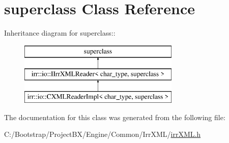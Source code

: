 \hypertarget{classsuperclass}{
\section{superclass Class Reference}
\label{classsuperclass}
}
Inheritance diagram for superclass::\begin{figure}[H]
\begin{center}
\leavevmode
\includegraphics[height=3cm]{classsuperclass}
\end{center}
\end{figure}


The documentation for this class was generated from the following file:\begin{CompactItemize}
\item 
C:/Bootstrap/ProjectBX/Engine/Common/IrrXML/\hyperlink{irr_x_m_l_8h}{irrXML.h}\end{CompactItemize}
